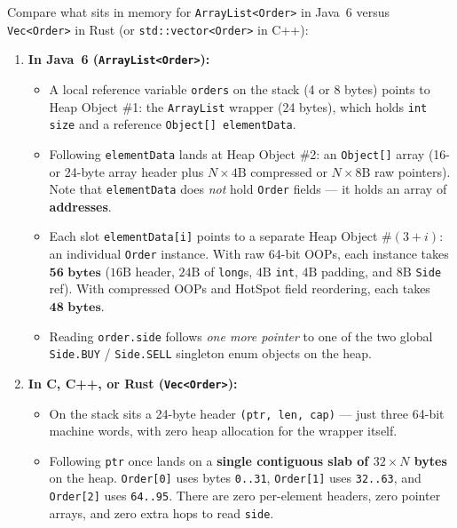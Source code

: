 Compare what sits in memory for \texttt{ArrayList<Order>} in Java~6 versus \texttt{Vec<Order>} in Rust (or \texttt{std::vector<Order>} in C++):

\begin{enumerate}
  \item \textbf{In Java~6 (\texttt{ArrayList<Order>}):}
    \begin{itemize}
      \item A local reference variable \texttt{orders} on the stack (4 or 8 bytes) points to Heap Object \#1: the \texttt{ArrayList} wrapper (24 bytes), which holds \texttt{int size} and a reference \texttt{Object[] elementData}.
      \item Following \texttt{elementData} lands at Heap Object \#2: an \texttt{Object[]} array (16- or 24-byte array header plus $N \times 4\text{B}$ compressed or $N \times 8\text{B}$ raw pointers). Note that \texttt{elementData} does \emph{not} hold \texttt{Order} fields --- it holds an array of \textbf{addresses}.
      \item Each slot \texttt{elementData[i]} points to a separate Heap Object \#$(3+i)$: an individual \texttt{Order} instance. With raw 64-bit OOPs, each instance takes $\mathbf{56\text{ bytes}}$ ($16\text{B}$ header, $24\text{B}$ of \texttt{long}s, $4\text{B}$ \texttt{int}, $4\text{B}$ padding, and $8\text{B}$ \texttt{Side} ref). With compressed OOPs and HotSpot field reordering, each takes $\mathbf{48\text{ bytes}}$.
      \item Reading \texttt{order.side} follows \emph{one more pointer} to one of the two global \texttt{Side.BUY} / \texttt{Side.SELL} singleton enum objects on the heap.
    \end{itemize}
  \item \textbf{In C, C++, or Rust (\texttt{Vec<Order>}):}
    \begin{itemize}
      \item On the stack sits a 24-byte header \texttt{(ptr, len, cap)} --- just three 64-bit machine words, with zero heap allocation for the wrapper itself.
      \item Following \texttt{ptr} once lands on a \textbf{single contiguous slab of $32 \times N$ bytes} on the heap. \texttt{Order[0]} uses bytes \texttt{0..31}, \texttt{Order[1]} uses \texttt{32..63}, and \texttt{Order[2]} uses \texttt{64..95}. There are zero per-element headers, zero pointer arrays, and zero extra hops to read \texttt{side}.
    \end{itemize}
\end{enumerate}

